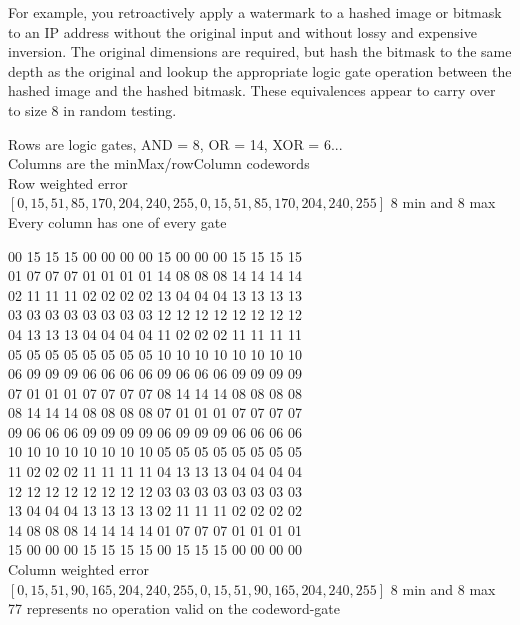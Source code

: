 \documentclass[11pt]{article}
\begin{document}
For example, you retroactively apply a watermark to a hashed image or bitmask to an IP address without the original input and without lossy and expensive inversion. The original dimensions are required, but hash the bitmask to the same depth as the original and lookup the appropriate logic gate operation between the hashed image and the hashed bitmask. These equivalences appear to carry over to size 8 in random testing.\\
\newpage
\begin{center}
Rows are logic gates, AND = 8, OR = 14, XOR = 6...\\
Columns are the minMax/rowColumn codewords\\
\hfill \break
Row weighted error\\
$[0,15,51,85,170,204,240,255,0,15,51,85,170,204,240,255]$ 8 min and 8 max\\
Every column has one of every gate\\
\hfill \break

00 15 15 15 00 00 00 00 15 00 00 00 15 15 15 15 \\
01 07 07 07 01 01 01 01 14 08 08 08 14 14 14 14 \\
02 11 11 11 02 02 02 02 13 04 04 04 13 13 13 13 \\
03 03 03 03 03 03 03 03 12 12 12 12 12 12 12 12 \\
04 13 13 13 04 04 04 04 11 02 02 02 11 11 11 11 \\
05 05 05 05 05 05 05 05 10 10 10 10 10 10 10 10 \\
06 09 09 09 06 06 06 06 09 06 06 06 09 09 09 09 \\
07 01 01 01 07 07 07 07 08 14 14 14 08 08 08 08 \\
08 14 14 14 08 08 08 08 07 01 01 01 07 07 07 07 \\
09 06 06 06 09 09 09 09 06 09 09 09 06 06 06 06 \\
10 10 10 10 10 10 10 10 05 05 05 05 05 05 05 05 \\
11 02 02 02 11 11 11 11 04 13 13 13 04 04 04 04 \\
12 12 12 12 12 12 12 12 03 03 03 03 03 03 03 03 \\
13 04 04 04 13 13 13 13 02 11 11 11 02 02 02 02 \\
14 08 08 08 14 14 14 14 01 07 07 07 01 01 01 01 \\
15 00 00 00 15 15 15 15 00 15 15 15 00 00 00 00 \\
\hfill \break
Column weighted error\\
$[0,15,51,90,165,204,240,255,0,15,51,90,165,204,240,255]$ 8 min and 8 max\\
77 represents no operation valid on the codeword-gate\\ 
\hfill \break


\end{center}
\end{document}
